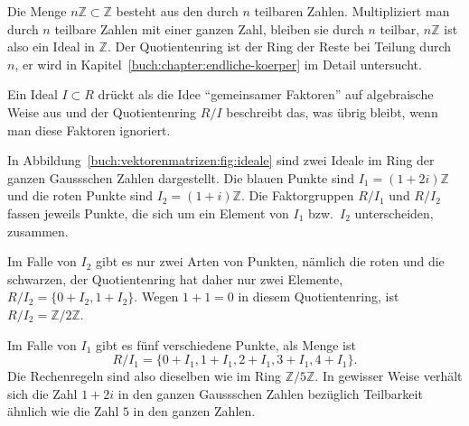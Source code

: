 \begin{beispiel}
Die Menge $n\mathbb{Z}\subset\mathbb{Z}$ besteht aus den durch $n$ teilbaren
Zahlen.
Multipliziert man durch $n$ teilbare Zahlen mit einer ganzen Zahl,
bleiben sie durch $n$ teilbar, $n\mathbb{Z}$ ist also ein Ideal in
$\mathbb{Z}$.
Der Quotientenring ist der Ring der Reste bei Teilung durch $n$,
er wird in 
Kapitel~\ref{buch:chapter:endliche-koerper}
im Detail untersucht.
\end{beispiel}

Ein Ideal $I\subset R$ drückt als die Idee ``gemeinsamer Faktoren''
auf algebraische Weise aus und der Quotientenring $R/I$ beschreibt
das, was übrig bleibt, wenn man diese Faktoren ignoriert.

\begin{beispiel}
In Abbildung~\ref{buch:vektorenmatrizen:fig:ideale} sind zwei
Ideale im Ring der ganzen Gaussschen Zahlen dargestellt.
Die blauen Punkte sind $I_1=(1+2i)\mathbb{Z}$ und die roten Punkte sind
$I_2=(1+i)\mathbb{Z}$.
Die Faktorgruppen $R/I_1$ und $R/I_2$ fassen jeweils Punkte, die sich
um ein Element von $I_1$ bzw.~$I_2$ unterscheiden, zusammen.

Im Falle von $I_2$ gibt es nur zwei Arten von Punkten, nämlich
die roten und die schwarzen, der Quotientenring hat
daher nur zwei Elemente, $R/I_2 = \{0+I_2,1+I_2\}$.
Wegen $1+1=0$ in diesem Quotientenring, ist $R/I_2=\mathbb{Z}/2\mathbb{Z}$.

Im Falle von $I_1$ gibt es fünf verschiedene Punkte, als Menge ist
\[
R/I_1 
=
\{
0+I_1,
1+I_1,
2+I_1,
3+I_1,
4+I_1
\}.
\]
Die Rechenregeln sind also dieselben wie im Ring $\mathbb{Z}/5\mathbb{Z}$.
In gewisser Weise verhält sich die Zahl $1+2i$ in den ganzen 
Gaussschen Zahlen bezüglich Teilbarkeit ähnlich wie die Zahl $5$ in den
ganzen Zahlen.
\end{beispiel}

